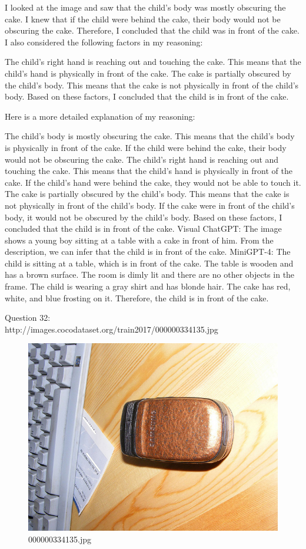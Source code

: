\begin{enumerate}
        I looked at the image and saw that the child's body was mostly obscuring the cake.
        I knew that if the child were behind the cake, their body would not be obscuring the cake.
        Therefore, I concluded that the child was in front of the cake.
        I also considered the following factors in my reasoning:

        The child's right hand is reaching out and touching the cake. This means that the child's hand is physically in front of the cake.
        The cake is partially obscured by the child's body. This means that the cake is not physically in front of the child's body.
        Based on these factors, I concluded that the child is in front of the cake.

        Here is a more detailed explanation of my reasoning:

        The child's body is mostly obscuring the cake. This means that the child's body is physically in front of the cake. If the child were behind the cake, their body would not be obscuring the cake.
        The child's right hand is reaching out and touching the cake. This means that the child's hand is physically in front of the cake. If the child's hand were behind the cake, they would not be able to touch it.
        The cake is partially obscured by the child's body. This means that the cake is not physically in front of the child's body. If the cake were in front of the child's body, it would not be obscured by the child's body.
        Based on these factors, I concluded that the child is in front of the cake.
        \subitem Visual ChatGPT: The image shows a young boy sitting at a table with a cake in front of him. From the description, we can infer that the child is in front of the cake.
        \subitem MiniGPT-4: The child is sitting at a table, which is in front of the cake. The table is wooden and has a brown surface. The room is dimly lit and there are no other objects in the frame. The child is wearing a gray shirt and has blonde hair. The cake has red, white, and blue frosting on it. Therefore, the child is in front of the cake.
    \end{enumerate}
    Question 32:\\http://images.cocodataset.org/train2017/000000334135.jpg
    \begin{figure}[h]
        \centering
        \includegraphics[width=0.8\linewidth]{../image set/easy/000000334135.jpg}
        \caption{000000334135.jpg}
    \end{figure}
